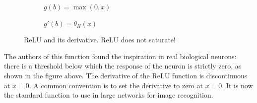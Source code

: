 \begin{figure}[h]  
	\centering 
	\begin{subfigure}[b]{0.4\linewidth}
		\caption{$ g(b)=\max(0,x) $}   
	\end{subfigure}
	\begin{subfigure}[b]{0.4\linewidth}
		\caption{$ g'(b)= \theta_H (x) $}  
	\end{subfigure}
	\vspace{10mm}
	\caption{ReLU and its derivative. ReLU does not saturate!}
\end{figure}

The authors of this function found the inspiration in real biological neurons: there is a threshold below which the response of the neuron is strictly zero, as shown in the figure above. The derivative of the ReLU function is discontinuous at $ x=0 $. A common convention is to set the derivative to zero at $ x=0 $. It is now the standard function to use in large networks for image recognition. \cite{mehlig}

\newpage

